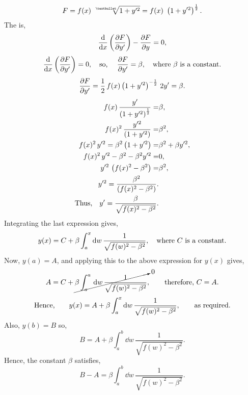 \vspace{-6mm}
\begin{equation*}
	F=f(x)\,\,\sqrt[•]{1+y^{\prime2}} = f(x)\,\,\lr{1 + y^{\prime2}}^\half.
\end{equation*}
The \el is,
\[
	\ELE{F}{x}{y},
\]
\[
	\deriv{}{x}\lr{\pderiv{F}{y^\prime}} = 0,\quad\textrm{so, }\quad\pderiv{F}{y^\prime} = \beta,\quad \textrm{where } \beta \textrm{ is a constant.}
\]
\[
	\pderiv{F}{y^\prime} =\half\, f(x) \lr{ 1+y^{\prime2}}^{-\half}\,2y^\prime = \beta.
\]
\begin{align*}
	f(x) \,   \frac{y^\prime}{\lr{1 + y^{\prime2}}^\half} =&\beta,\\
	f(x)^2 \, \frac{y^{\prime2}}{\lr{1 + y^{\prime2}}} =& \beta^2,\\
	f(x)^2 \,y^{\prime2} = \beta^2\lr{1 + y^{\prime2}} =& \beta^2 + \beta y^{\prime2},\\
	f(x)^2 \,y^{\prime2} - \beta^2 - \beta^2 y^{\prime2} =& 0,\\
	y^{\prime2} \,\lr{f(x)^2 - \beta^2 } =& \beta^2,\\
	y^{\prime2}  = \frac{\beta^2}{\lr{f(x)^2 - \beta^2 }}.\\
	\textrm{Thus,}\quad y^{\prime}  = \frac{\beta}{\sqrt{f(x)^2 - \beta^2 }}.
\end{align*}
Integrating the last expression gives,
\[
	y(x) = C + \beta \Int{a}{x}{w}\frac{1}{\sqrt{f(w)^2 - \beta^2 }},\quad\textrm{where $C$ is a constant.}
\]
Now, $y(a) = A$, and applying this to the above expression for $y(x)$ gives,
\[
	A = C + \cancelto{0}{\beta\int_a^a\dd w\, \frac{1}{\sqrt{f(w)^2 -\beta^2}}},\qquad\textrm{therefore, } C=A.
\]
\[
	\textrm{Hence,}\qquad y(x) = A + \beta \Int{a}{x}{w}\frac{1}{\sqrt{f(w)^2 - \beta^2 }},\qquad\textrm{as required.}
\]
Also, $y(b) = B$ so,
\[
	B = A + \beta\int_a^b\dd w\, \frac{1}{\sqrt{f(w)^2 -\beta^2}}.
\]
Hence, the constant $\beta$ satisfies,
\[
	B - A = \beta \int_a^b\dd w\, \frac{1}{\sqrt{f(w)^2 -\beta^2}}.
\]